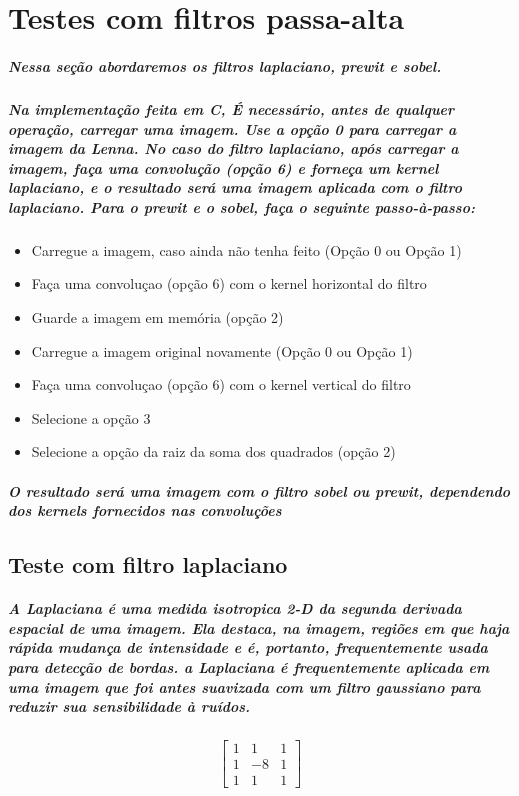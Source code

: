 \documentclass[12pt,fleqn]{article}
\begin{document}
\section{Testes com filtros passa-alta}

  \subparagraph{\normalfont Nessa seção abordaremos os filtros laplaciano, prewit e sobel.}

  \subparagraph{\normalfont Na implementação feita em C, É necessário, antes de qualquer operação, carregar uma imagem. Use a opção 0 para carregar a imagem da Lenna. 
  No caso do filtro laplaciano, após carregar a imagem, faça uma convolução (opção 6) e forneça um kernel laplaciano, e o resultado será uma imagem aplicada com o filtro laplaciano. 
  Para o prewit e o sobel, faça o seguinte passo-à-passo: }


  \begin{itemize}
    \item Carregue a imagem, caso ainda não tenha feito (Opção 0 ou Opção 1)
    \item Faça uma convoluçao (opção 6) com o kernel horizontal do filtro
    \item Guarde a imagem em memória (opção 2)
    \item Carregue a imagem original novamente (Opção 0 ou Opção 1)
    \item Faça uma convoluçao (opção 6) com o kernel vertical do filtro
    \item Selecione a opção 3
    \item Selecione a opção da raiz da soma dos quadrados (opção 2)
  \end{itemize}

  \subparagraph{\normalfont O resultado será uma imagem com o filtro sobel ou prewit, dependendo dos kernels fornecidos nas convoluções}

  \subsection{Teste com filtro laplaciano}

  \subparagraph{\normalfont A Laplaciana é uma medida isotropica 2-D da segunda derivada espacial de uma imagem. Ela destaca, na imagem, regiões em que haja rápida mudança de intensidade e é,
  portanto, frequentemente usada para detecção de bordas. a Laplaciana é frequentemente aplicada em uma imagem que foi antes suavizada com um filtro gaussiano para reduzir sua sensibilidade à ruídos.}


  \begin{equation*}
    \begin{bmatrix}
        1 & 1 & 1 \\
        1 & -8 & 1 \\
        1 & 1 & 1 
    \end{bmatrix}
  \end{equation*}
\end{document}
